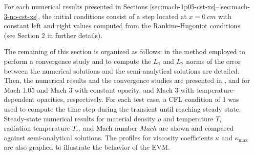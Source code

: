 \documentclass[times,doublespace]{fldauth}%
\begin{document}
For each numerical results presented in Sections \ref{sec:mach-1p05-cst-xs}--\ref{sec:mach-3-no-cst-xs}, the initial conditions consist of a step located at $x=0 \ cm$ with constant left and right values computed from the Rankine-Hugoniot conditions (see Section 2 in \cite{LowrieEdwards} further details).

The remaining of this section is organized as follows: in  the method employed to perform a convergence study and to compute the $L_1$ and $L_2$ norms of the error between the numerical solutions and the semi-analytical solutions are detailed. Then, the numerical results and the convergence studies are presented in ,  and  for Mach 1.05 and Mach 3 with constant opacity, and Mach 3 with temperature-dependent opacities, respectively. For each test case, a CFL condition of 1 was used to compute the time step during the transient until reaching steady state. Steady-state numerical results for material density $\rho$ and temperature $T$,  radiation temperature $T_r$, and Mach number $Mach$ are shown and compared against semi-analytical solutions. The profiles for viscosity coefficients $\kappa$ and $\kappa_\text{max}$ are also graphed to illustrate the behavior of the EVM.
%
\end{document}
